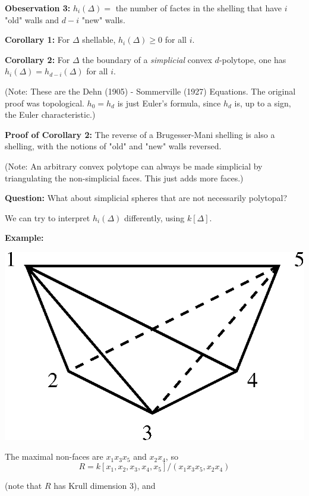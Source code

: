 \documentclass{amsart}
\begin{document}
{\bf Obeservation 3:} $h_i(\Delta) =$ the number of factes in the shelling that have $i$ 
"old" walls and $d-i$ "new" walls.


{\bf Corollary 1:} For $\Delta$ shellable, $h_i(\Delta) \geq 0$ for all $i$.

{\bf Corollary 2:} For $\Delta$ the boundary of a \emph{simplicial} convex 
$d$-polytope, one has $h_i(\Delta) = h_{d-i}(\Delta)$ for all $i$.

(Note: These are the Dehn (1905) - Sommerville (1927) Equations. The 
original proof was topological. $h_0 = h_d$ is just Euler's formula, 
since $h_d$ is, up to a sign, the Euler characteristic.)

{\bf Proof of Corollary 2:} The reverse of a Brugesser-Mani shelling is also a shelling, with 
the notions of "old" and "new" walls reversed.

(Note: An arbitrary convex polytope can always be made simplicial by 
triangulating the non-simplicial faces. This just adds more faces.)

{\bf Question:} What about simplicial spheres that are not necessarily polytopal?

We can try to interpret $h_i(\Delta)$ differently, using $k[\Delta]$.

\newpage

{\bf Example:}

\begin{center}
\includegraphics[totalheight=1in]{vic3fig2}
\end{center}

The maximal non-faces are $x_1 x_3 x_5$ and $x_2 x_4$, so
$$R = k[x_1, x_2, x_3, x_4, x_5]/(x_1 x_3 x_5, x_2 x_4)$$

(note that $R$ has Krull dimension 3), and 
\end{document}
